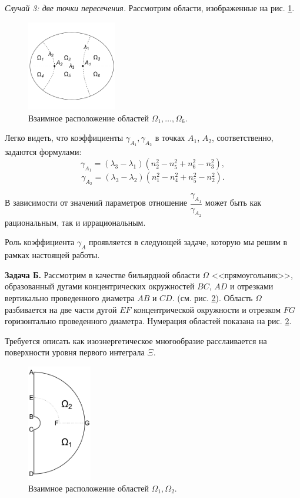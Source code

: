  \medskip
\textit{ Случай 3: две точки пересечения.}
Рассмотрим области, изображенные на рис. \ref{fig:pt8:_example8}. 
\begin{figure}[!htb]
\centering
   \includegraphics[width=0.35\textwidth]{images/ch4/section1/img4.pdf}   
    \caption{Взаимное расположение областей $\Omega_1, \ldots, \Omega_6$.}
    \label{fig:pt8:_example8}
\end{figure}


Легко видеть, что коэффициенты $\gamma_{A_1}, \gamma_{A_2}$ в точках $A_1$, $A_2$, соответственно, задаются формулами:
$$\gamma_{A_1} = (\lambda_3 - \lambda_1)(n_2^2 - n_5^2 + n_6^2 - n_3^2),$$
$$\gamma_{A_2} = (\lambda_3 - \lambda_2)(n_1^2 - n_4^2 + n_5^2 - n_2^2).$$

В зависимости от значений параметров отношение $\dfrac{\gamma_{A_1}}{\gamma_{A_2}}$ может быть как рациональным, так и иррациональным.

Роль коэффициента $\gamma_A$ проявляется в следующей задаче, которую мы решим в рамках настоящей работы.

\textbf{Задача Б.} Рассмотрим в качестве бильярдной области $\Omega$  <<прямоугольник>>, образованный дугами концентрических окружностей $BC$, $AD$ и отрезками вертикально проведенного диаметра $AB$ и $CD$. (см. рис. \ref{fig:pt8:_example9}).
Область $\Omega$ разбивается на две части дугой  $EF$ концентрической окружности  и отрезком $FG$ горизонтально проведенного диаметра. Нумерация областей показана на рис. \ref{fig:pt8:_example9}.

Требуется описать как изоэнергетическое многообразие расслаивается на поверхности уровня первого интеграла $\Xi$.


\begin{figure}[!htb]
\centering
   \includegraphics[width=0.25\textwidth]{images/ch4/section1/imgB.pdf}   
    \caption{Взаимное расположение областей $\Omega_1, \Omega_2$.}
    \label{fig:pt8:_example9}
\end{figure}

